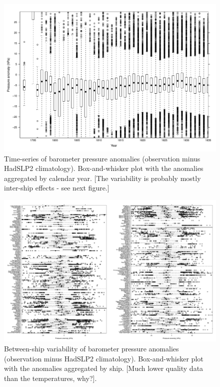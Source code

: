 \documentclass[a4paper,11pt]{article}
\begin{document}
\begin{figure}
\begin{center}
\includegraphics[angle=0, width=1.0\textwidth]{../anomaly_ts/pre_anom_bwplot}
\caption{Time-series of barometer pressure anomalies (observation minus HadSLP2 climatology). Box-and-whisker plot with the anomalies aggregated by calendar year. [The variability is probably mostly inter-ship effects - see next figure.]}
\label{pre_anom_bwplot}
\end{center}
\end{figure}

\begin{figure}
\begin{center}
\includegraphics[angle=90, width=1.0\textwidth]{../anomaly_ts/pre_anom_bwplot_byShip}
\caption{Between-ship variability of barometer pressure anomalies (observation minus HadSLP2 climatology). Box-and-whisker plot with the anomalies aggregated by ship. [Much lower quality data than the temperatures, why?].}
\label{pre_anom_bwplot_byShip}
\end{center}
\end{figure}
\end{document}
